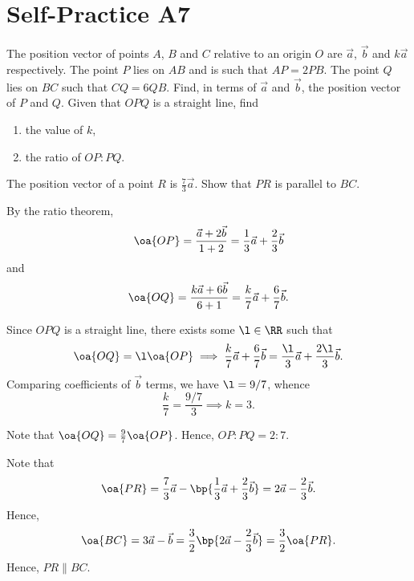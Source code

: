\section{Self-Practice A7}

\begin{problem}
    The position vector of points $A$, $B$ and $C$ relative to an origin $O$ are $\vec a$, $\vec b$ and $k \vec a$ respectively. The point $P$ lies on $AB$ and is such that $AP = 2PB$. The point $Q$ lies on $BC$ such that $CQ = 6QB$. Find, in terms of $\vec a$ and $\vec b$, the position vector of $P$ and $Q$. Given that $OPQ$ is a straight line, find
    \begin{enumerate}
        \item the value of $k$,
        \item the ratio of $OP:PQ$.
    \end{enumerate}
    The position vector of a point $R$ is $\frac73 \vec a$. Show that $PR$ is parallel to $BC$.
\end{problem}
\begin{solution}
    By the ratio theorem, \[\oa{OP} = \frac{\vec a + 2 \vec b}{1 + 2} = \frac13 \vec a + \frac23 \vec b\] and \[\oa{OQ} = \frac{k \vec a + 6 \vec b}{6 + 1} = \frac{k}{7} \vec a + \frac67 \vec b.\]

    \begin{ppart}
        Since $OPQ$ is a straight line, there exists some $\l \in \RR$ such that \[\oa{OQ} = \l \oa{OP} \implies \frac{k}{7} \vec a + \frac67 \vec b = \frac\l3 \vec a + \frac{2\l}3 \vec b.\] Comparing coefficients of $\vec b$ terms, we have $\l = 9/7$, whence \[\frac{k}{7} = \frac{9/7}{3} \implies k = 3.\]
    \end{ppart}
    \begin{ppart}
        Note that $\oa{OQ} = \frac97 \oa{OP}$. Hence, $OP:PQ = 2:7$.
    \end{ppart}

    Note that \[\oa{PR} = \frac73 \vec a - \bp{\frac13 \vec a + \frac23 \vec b} = 2\vec a - \frac23 \vec b.\] Hence, \[\oa{BC} = 3\vec a - \vec b = \frac32 \bp{2\vec a - \frac23 \vec b} = \frac32 \oa{PR}.\] Hence, $PR \parallel BC$.
\end{solution}


